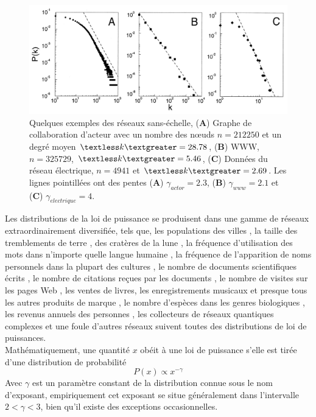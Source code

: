 \begin{figure}[h!]
	\centering
	\includegraphics[scale=0.3]{./figures/scal-free-reels}
	\caption{Quelques exemples des réseaux sans-échelle, (\textbf{A}) Graphe de collaboration d'acteur avec un nombre des nœuds
		$n=212250$ et un degré moyen $\textless k\textgreater=28.78$, (\textbf{B}) WWW, $n=325729$, $\textless k\textgreater=5.46$,
		(\textbf{C}) Données du réseau électrique, $n=4941$ et $\textless k\textgreater=2.69$. Les lignes pointillées ont des pentes
		(\textbf{A}) $\gamma_{actor}=2.3$, (\textbf{B}) $\gamma_{www}=2.1$ et (\textbf{C}) $\gamma_{electrique}=4$.}
	
	\label{scal-free-reels}
\end{figure}
Les distributions de la loi de puissance se produisent dans une gamme de réseaux extraordinairement diversifiée, tels que, les populations des  villes \cite{New2005,Aa-al2009}, la taille des tremblements de terre \cite{GuR1944}, des cratères de la lune  \cite{NeI1994}, la fréquence d'utilisation des mots dans n'importe quelle langue humaine \cite{Zipf1949,Estoup1916}, la  fréquence de l'apparition de noms personnels dans la plupart des cultures \cite{ZaM2001}, le nombre de documents scientifiques écrits \cite{LoW1926}, le nombre de citations reçues par les documents \cite{Price1965}, le nombre de visites sur les pages Web \cite{AdH2000}, les ventes de livres, les enregistrements musicaux et presque tous les autres produits de marque \cite{Cox-al1995}, le nombre d'espèces dans les genres biologiques \cite{WilY1922}, les revenus annuels des personnes \cite{Pareto1896}, les collecteurs de réseaux quantiques complexes \cite{BiR2015} et une foule d'autres réseaux suivent toutes des distributions de loi de puissances.\\

Mathématiquement, une quantité $x$ obéit à une loi de puissance s'elle est tirée d'une distribution de probabilité
\begin{equation}
P(x)\propto x^{-\gamma}
\end{equation}
Avec $\gamma$ est un paramètre constant de la distribution connue sous le nom d'exposant, empiriquement cet exposant se situe
généralement dans l'intervalle $2<\gamma<3$, bien qu'il existe des exceptions occasionnelles.

